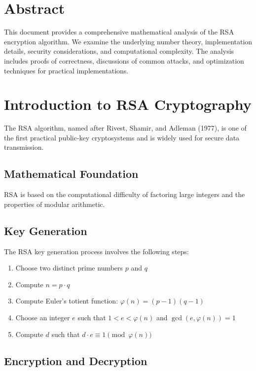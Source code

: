 \section*{Abstract}
		This document provides a comprehensive mathematical analysis of the RSA encryption algorithm. We examine the underlying number theory, implementation details, security considerations, and computational complexity. The analysis includes proofs of correctness, discussions of common attacks, and optimization techniques for practical implementations.

	
	
	\section{Introduction to RSA Cryptography}
	
	The RSA algorithm, named after Rivest, Shamir, and Adleman (1977), is one of the first practical public-key cryptosystems and is widely used for secure data transmission.
	
	\subsection{Mathematical Foundation}
	
	RSA is based on the computational difficulty of factoring large integers and the properties of modular arithmetic.
	
	\subsection{Key Generation}
	
	The RSA key generation process involves the following steps:
	
	\begin{enumerate}
		\item Choose two distinct prime numbers $p$ and $q$
		\item Compute $n = p \cdot q$
		\item Compute Euler's totient function: $\varphi(n) = (p-1)(q-1)$
		\item Choose an integer $e$ such that $1 < e < \varphi(n)$ and $\gcd(e, \varphi(n)) = 1$
		\item Compute $d$ such that $d \cdot e \equiv 1 \pmod{\varphi(n)}$
	\end{enumerate}
	
	\subsection{Encryption and Decryption}
	

